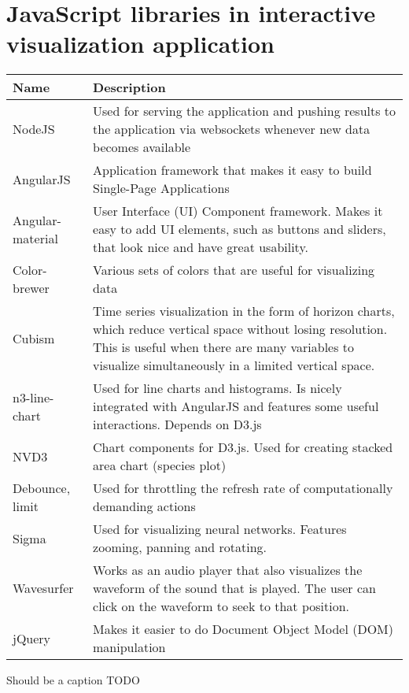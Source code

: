 
\chapter{JavaScript libraries in interactive visualization application}
\label{appendix:javascript_dependencies}

\begin{minipage}{\linewidth}
\centering
{} \label{tab:title} 
\begin{tabular}{ C{1.5in} C{4.6in} }\toprule[1.5pt]
\bf Name & \bf Description \\
\midrule
  NodeJS & Used for serving the application and pushing results to the application via websockets whenever new data becomes available \\
\midrule
  AngularJS & Application framework that makes it easy to build Single-Page Applications \\
\midrule
  Angular-material & User Interface (UI) Component framework. Makes it easy to add UI elements, such as buttons and sliders, that look nice and have great usability. \\
\midrule
  Color-brewer & Various sets of colors that are useful for visualizing data \\
\midrule
  Cubism & Time series visualization in the form of horizon charts, which reduce vertical space without losing resolution. This is useful when there are many variables to visualize simultaneously in a limited vertical space. \\
\midrule
  n3-line-chart & Used for line charts and histograms. Is nicely integrated with AngularJS and features some useful interactions. Depends on D3.js \\
\midrule
  NVD3 & Chart components for D3.js. Used for creating stacked area chart (species plot) \\
\midrule
  Debounce, limit & Used for throttling the refresh rate of computationally demanding actions \\
\midrule
  Sigma & Used for visualizing neural networks. Features zooming, panning and rotating. \\
\midrule
  Wavesurfer & Works as an audio player that also visualizes the waveform of the sound that is played. The user can click on the waveform to seek to that position. \\
\midrule
  jQuery & Makes it easier to do Document Object Model (DOM) manipulation \\

\bottomrule[1.25pt]
\end {tabular}\par
\bigskip
Should be a caption TODO
\end{minipage}